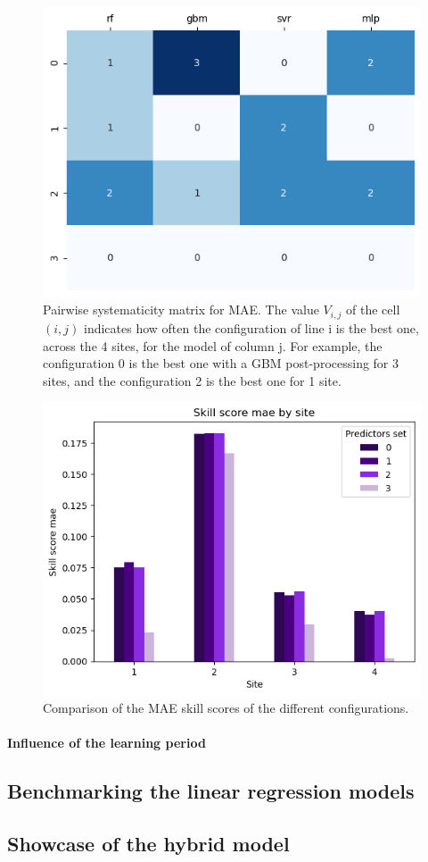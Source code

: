 \begin{figure}[htb!]
    \centering
    \includegraphics[width=\columnwidth]{figures/first_study/comp_predictors_mae.png}
\caption{Pairwise systematicity matrix for MAE. The value $V_{i,j}$ of
 the cell $(i,j)$ indicates how often the configuration of line i is the best one, across 
 the 4 sites, for the model of column j. For example, the configuration 0 is the best one
 with a GBM post-processing for 3 sites, and the configuration 2 is the best one for 1 site.}
\end{figure}

\begin{figure}[htb!]
    \centering
    \includegraphics[width=\columnwidth]{figures/first_study/comp_predictors_mae_svr.png}
\caption{Comparison of the MAE skill scores of the different configurations.}
\end{figure}

\paragraph{Influence of the learning period}

\subsection{Benchmarking the linear regression models}
\subsection{Showcase of the hybrid model}